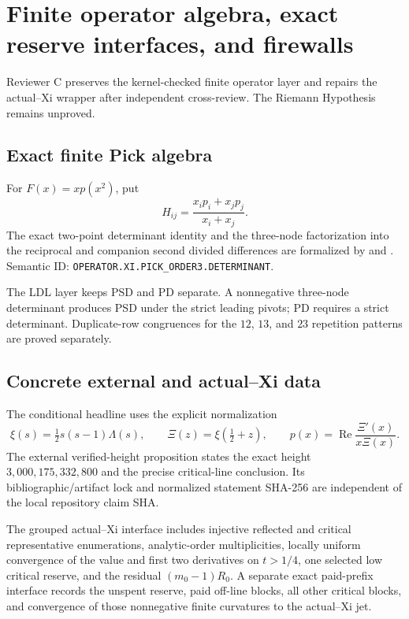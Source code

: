 \section{Finite operator algebra, exact reserve interfaces, and firewalls}

Reviewer C preserves the kernel-checked finite operator layer and repairs the
actual--Xi wrapper after independent cross-review.  The Riemann Hypothesis
remains unproved.

\subsection{Exact finite Pick algebra}

For $F(x)=x p(x^2)$, put
\[
  H_{ij}=\frac{x_i p_i+x_j p_j}{x_i+x_j}.
\]
The exact two-point determinant identity and the three-node factorization into
the reciprocal and companion second divided differences are formalized by
 and
.
Semantic ID: \texttt{OPERATOR.XI.PICK\_ORDER3.DETERMINANT}.

The LDL layer keeps PSD and PD separate.  A nonnegative three-node determinant
produces PSD under the strict leading pivots; PD requires a strict determinant.
Duplicate-row congruences for the $12$, $13$, and $23$ repetition patterns are
proved separately.

\subsection{Concrete external and actual--Xi data}

The conditional headline uses the explicit normalization
\[
 \xi(s)=\tfrac12s(s-1)\Lambda(s),\qquad
 \Xi(z)=\xi(\tfrac12+z),\qquad
 p(x)=\operatorname{Re}\frac{\Xi'(x)}{x\Xi(x)}.
\]
The external verified-height proposition states the exact height
$3{,}000{,}175{,}332{,}800$ and the precise critical-line conclusion.  Its
bibliographic/artifact lock and normalized statement SHA-256 are independent of
the local repository claim SHA.

The grouped actual--Xi interface includes injective reflected and critical
representative enumerations, analytic-order multiplicities, locally uniform
convergence of the value and first two derivatives on $t>1/4$, one selected
low critical reserve, and the residual $(m_0-1)R_0$.  A separate exact
paid-prefix interface records the unspent reserve, paid off-line blocks, all
other critical blocks, and convergence of those nonnegative finite curvatures
to the actual--Xi jet.

